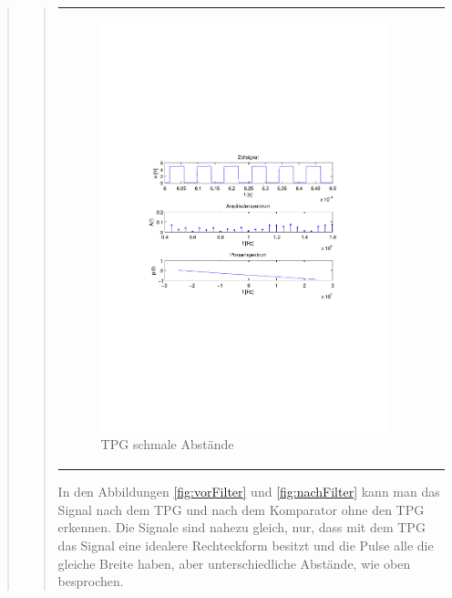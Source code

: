 \begin{quote}
\begin{quote}
\begin{center}
\begin{tabular}{ll}
                \begin{minipage}{0.67\textwidth}
                    \begin{figure}[H]
                        \includegraphics[scale=0.7, trim = 35mm 100mm 35mm 95mm, clip]{Bilder/f1TwPu_schmal}
                        \caption{TPG schmale Abstände}
                        \label{fig:TPGschmal}
                    \end{figure}
                \end{minipage}
            
            \end{tabular}
            \end{center}
          
          In den Abbildungen \ref{fig:vorFilter} und \ref{fig:nachFilter} kann
          man das Signal nach dem TPG und nach dem Komparator ohne den TPG
          erkennen. Die Signale sind nahezu gleich, nur, dass mit dem TPG das
          Signal eine idealere Rechteckform besitzt und die Pulse alle die
          gleiche Breite haben, aber unterschiedliche Abstände, wie oben
          besprochen.
            

\end{quote}
\end{quote}
